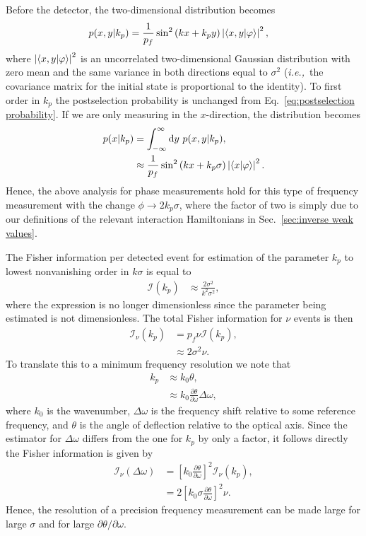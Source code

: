 Before the detector, the two-dimensional distribution becomes
\begin{align}
	p(x,y|k_p) &= \frac{1}{p_f} \sin^2\left(kx + k_p y\right)\left|\langle x,y \vert \varphi \rangle\right|^2,
\end{align} 
where $\left|\langle x,y \vert \varphi \rangle\right|^2$ is an uncorrelated two-dimensional Gaussian distribution with zero mean and the same variance in both directions equal to $\sigma^2$ (\emph{i.e.,}~the covariance matrix for the initial state is proportional to the identity).  To first order in $k_p$ the postselection probability is unchanged from Eq.~\eqref{eq:postselection probability}.  If we are only measuring in the $x$-direction, the distribution becomes
\begin{align}
	\nonumber p(x|k_p) &= \int_{-\infty}^{\infty} \text{d}y~p(x,y|k_p), \\
	&\approx \frac{1}{p_f}\sin^2\left(kx +k_p \sigma \right)\left|\langle x \vert \varphi \rangle\right|^2.
\end{align}
Hence, the above analysis for phase measurements hold for this type of frequency measurement with the change $\phi \rightarrow 2k_p \sigma$, where the factor of two is simply due to our definitions of the relevant interaction Hamiltonians in Sec.~\ref{sec:inverse weak values}.  

The Fisher information per detected event for estimation of the parameter $k_p$ to lowest nonvanishing order in $k\sigma$ is equal to 
\begin{align}
	\mathcal{I}(k_p) &\approx \frac{2\sigma^2}{k^2\sigma^2}, 
\end{align} 
where the expression is no longer dimensionless since the parameter being estimated is not dimensionless.  The total Fisher information for $\nu$ events is then
\begin{align}
	\mathcal{I}_\nu(k_p) &= p_f \nu \mathcal{I}(k_p), \nonumber \\
	& \approx 2 \sigma^2 \nu .
\end{align}
To translate this to a minimum frequency resolution we note that 
\begin{align}
	k_p &\approx k_0 \theta, \nonumber \\
	& \approx k_0 \frac{\partial \theta}{\partial \omega}\Delta \omega,
\end{align}
where $k_0$ is the wavenumber, $\Delta \omega$ is the frequency shift relative to some reference frequency, and $\theta$ is the angle of deflection relative to the optical axis.  Since the estimator for $\Delta \omega$ differs from the one for $k_p$ by only a factor, it follows directly the Fisher information is given by 
\begin{align}
	\mathcal{I}_\nu(\Delta \omega) &= \left[k_0\frac{\partial \theta}{\partial \omega}\right]^{2}\mathcal{I}_\nu(k_p), \nonumber \\
	&= 2\left[k_0\sigma\frac{\partial \theta}{\partial \omega}\right]^{2}\nu.
\end{align}
Hence, the resolution of a precision frequency measurement can be made large for large $\sigma$ and for large $\partial\theta/\partial\omega$.

